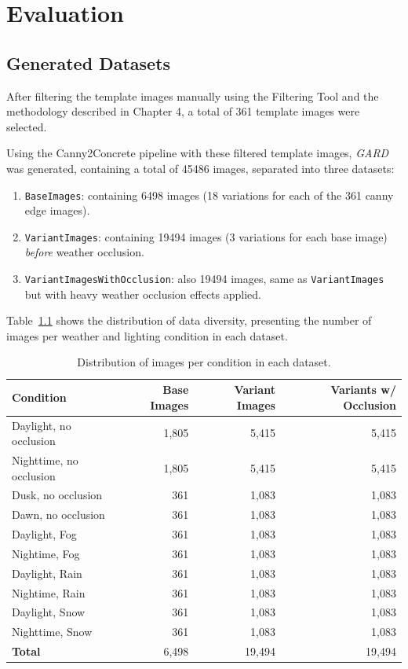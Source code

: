 \chapter{Evaluation}

\section{Generated Datasets}

After filtering the template images manually using the Filtering Tool and
the methodology described in Chapter 4, a total of 361 template images were
selected.

Using the Canny2Concrete pipeline with these filtered template images,
\emph{GARD} was generated, containing a total of 45486 images, separated
into three datasets:

\begin{enumerate}
\item \texttt{BaseImages}: containing 6498 images (18 variations for each of the 361 canny edge images).
\item \texttt{VariantImages}: containing 19494 images (3 variations for each base image) \emph{before} weather occlusion.
\item \texttt{VariantImagesWithOcclusion}: also 19494 images, same as
  \texttt{VariantImages} but with heavy weather occlusion effects applied.
\end{enumerate}

Table~\ref{tab:dataset_distribution} shows the distribution of data diversity,
presenting the number of images per weather and lighting condition in each dataset.

\begin{table}[h]
\centering
\caption{Distribution of images per condition in each dataset.}
\label{tab:dataset_distribution}
\begin{tabular}{|l|r|r|r|}
\hline
\textbf{Condition} & \textbf{Base Images} & \textbf{Variant Images} &
  \textbf{Variants w/ Occlusion} \\
\hline
Daylight, no occlusion     & 1,805 & 5,415 & 5,415 \\
Nighttime, no occlusion    & 1,805 & 5,415 & 5,415 \\
Dusk, no occlusion         & 361   & 1,083 & 1,083 \\
Dawn, no occlusion         & 361   & 1,083 & 1,083 \\
Daylight, Fog              & 361   & 1,083 & 1,083 \\
Nightime, Fog              & 361   & 1,083 & 1,083 \\
Daylight, Rain             & 361   & 1,083 & 1,083 \\
Nightime, Rain             & 361   & 1,083 & 1,083 \\
Daylight, Snow             & 361   & 1,083 & 1,083 \\
Nighttime, Snow            & 361   & 1,083 & 1,083 \\
\hline
\textbf{Total}             & 6,498 & 19,494 & 19,494 \\
\hline
\end{tabular}
\end{table}

